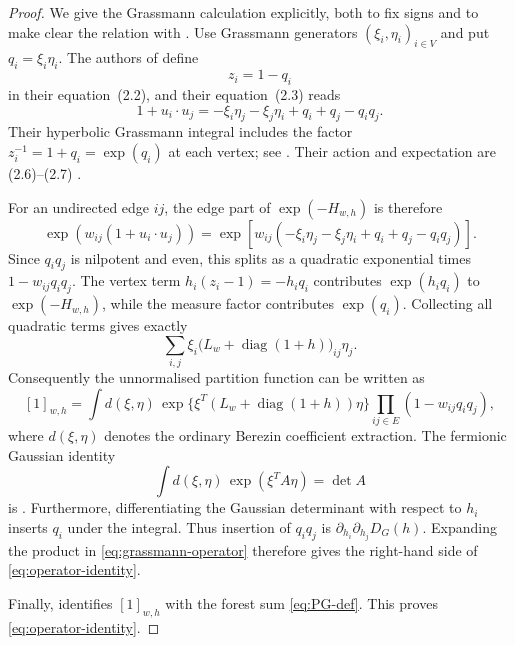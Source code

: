 \documentclass[11pt]{article}
\theoremstyle{definition}
\theoremstyle{remark}
\newcommand{\1}{\mathbf 1}
\newcommand{\diag}{\operatorname{diag}}
\begin{document}
\begin{proof}
We give the Grassmann calculation explicitly, both to fix signs and to make clear the
relation with \cite{BCHS}.  Use Grassmann generators $(\xi_i,\eta_i)_{i\in V}$ and put
$q_i=\xi_i\eta_i$.  The authors of \cite{BCHS} define
\begin{equation}
 z_i=1-q_i
\end{equation}
in their equation~(2.2), and their equation~(2.3) reads
\begin{equation}
 1+u_i\cdot u_j
 =-\xi_i\eta_j-\xi_j\eta_i+q_i+q_j-q_iq_j.
\end{equation}
Their hyperbolic Grassmann integral includes the factor
$z_i^{-1}=1+q_i=\exp(q_i)$ at each vertex; see \cite[(2.5)]{BCHS}.  Their action and
expectation are (2.6)--(2.7) \cite[(2.2)--(2.7)]{BCHS}.

For an undirected edge $ij$, the edge part of $\exp(-H_{w,h})$ is therefore
\begin{equation}
 \exp\!\left(w_{ij}(1+u_i\cdot u_j)\right)
 =\exp\!\left[w_{ij}
   (-\xi_i\eta_j-\xi_j\eta_i+q_i+q_j-q_iq_j)\right].
\end{equation}
Since $q_iq_j$ is nilpotent and even, this splits as a quadratic exponential times
$1-w_{ij}q_iq_j$.  The vertex term $h_i(z_i-1)=-h_iq_i$ contributes
$\exp(h_iq_i)$ to $\exp(-H_{w,h})$, while the measure factor contributes
$\exp(q_i)$.  Collecting all quadratic terms gives exactly
\begin{equation}
 \sum_{i,j}\xi_i
 \bigl(L_w+\diag(1+h)\bigr)_{ij}\eta_j.
\end{equation}
Consequently the unnormalised partition function can be written as
\begin{equation}\label{eq:grassmann-operator}
 [1]_{w,h}
 =\int d(\xi,\eta)\,
 \exp\{\xi^T(L_w+\diag(1+h))\eta\}
 \prod_{ij\in E}(1-w_{ij}q_iq_j),
\end{equation}
where $d(\xi,\eta)$ denotes the ordinary Berezin coefficient extraction.
The fermionic Gaussian identity
\begin{equation}
 \int d(\xi,\eta)\,\exp(\xi^TA\eta)=\det A
\end{equation}
is \cite[Lemma~2.11, (2.74)]{BCHS}.
Furthermore, differentiating the Gaussian determinant with respect to $h_i$ inserts
$q_i$ under the integral.  Thus insertion of $q_iq_j$ is
$\partial_{h_i}\partial_{h_j}D_G(h)$.  Expanding the product in
\eqref{eq:grassmann-operator} therefore gives the right-hand side of
\eqref{eq:operator-identity}.

Finally, \cite[Theorem~2.1]{BCHS} identifies $[1]_{w,h}$ with the forest sum
\eqref{eq:PG-def}.  This proves \eqref{eq:operator-identity}.
\end{proof}
\end{document}
